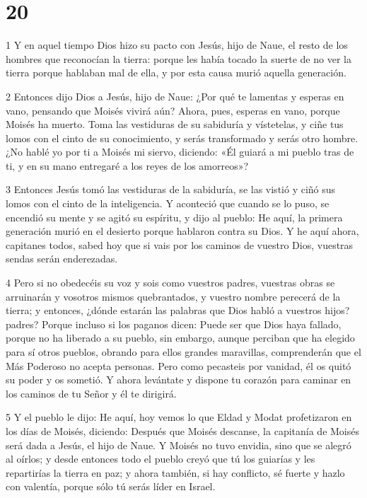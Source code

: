 \chapter{20}

\par 1 Y en aquel tiempo Dios hizo su pacto con Jesús, hijo de Naue, el resto de los hombres que reconocían la tierra: porque les había tocado la suerte de no ver la tierra porque hablaban mal de ella, y por esta causa murió aquella generación.

\par 2 Entonces dijo Dios a Jesús, hijo de Naue: ¿Por qué te lamentas y esperas en vano, pensando que Moisés vivirá aún? Ahora, pues, esperas en vano, porque Moisés ha muerto. Toma las vestiduras de su sabiduría y vístetelas, y ciñe tus lomos con el cinto de su conocimiento, y serás transformado y serás otro hombre. ¿No hablé yo por ti a Moisés mi siervo, diciendo: «Él guiará a mi pueblo tras de ti, y en su mano entregaré a los reyes de los amorreos»?

\par 3 Entonces Jesús tomó las vestiduras de la sabiduría, se las vistió y ciñó sus lomos con el cinto de la inteligencia. Y aconteció que cuando se lo puso, se encendió su mente y se agitó su espíritu, y dijo al pueblo: He aquí, la primera generación murió en el desierto porque hablaron contra su Dios. Y he aquí ahora, capitanes todos, sabed hoy que si vais por los caminos de vuestro Dios, vuestras sendas serán enderezadas.

\par 4 Pero si no obedecéis su voz y sois como vuestros padres, vuestras obras se arruinarán y vosotros mismos quebrantados, y vuestro nombre perecerá de la tierra; y entonces, ¿dónde estarán las palabras que Dios habló a vuestros hijos? padres? Porque incluso si los paganos dicen: Puede ser que Dios haya fallado, porque no ha liberado a su pueblo, sin embargo, aunque perciban que ha elegido para sí otros pueblos, obrando para ellos grandes maravillas, comprenderán que el Más Poderoso no acepta personas. Pero como pecasteis por vanidad, él os quitó su poder y os sometió. Y ahora levántate y dispone tu corazón para caminar en los caminos de tu Señor y él te dirigirá.

\par 5 Y el pueblo le dijo: He aquí, hoy vemos lo que Eldad y Modat profetizaron en los días de Moisés, diciendo: Después que Moisés descanse, la capitanía de Moisés será dada a Jesús, el hijo de Naue. Y Moisés no tuvo envidia, sino que se alegró al oírlos; y desde entonces todo el pueblo creyó que tú los guiarías y les repartirías la tierra en paz; y ahora también, si hay conflicto, sé fuerte y hazlo con valentía, porque sólo tú serás líder en Israel.

